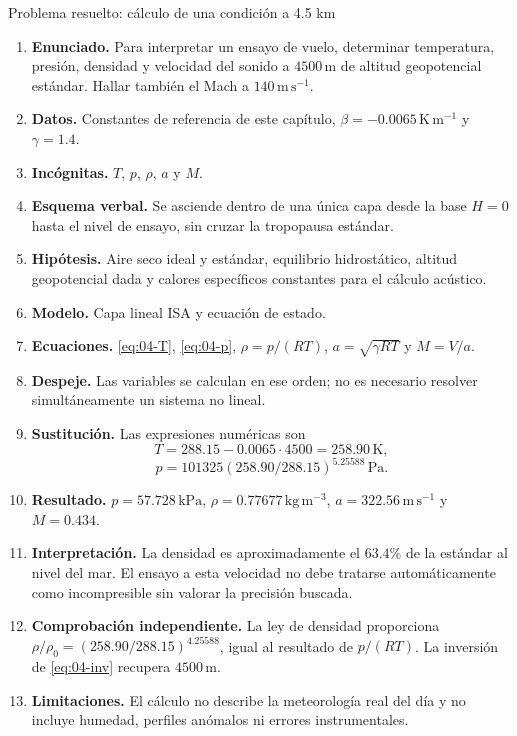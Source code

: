 \begin{studiumworked}{Problema resuelto: cálculo de una condición a 4.5 km}

\begin{enumerate}
\item \textbf{Enunciado.} Para interpretar un ensayo de vuelo, determinar temperatura, presión, densidad y velocidad del sonido a $4500\,\mathrm{m}$ de altitud geopotencial estándar. Hallar también el Mach a $140\,\mathrm{m\,s^{-1}}$.
\item \textbf{Datos.} Constantes de referencia de este capítulo, $\beta=-0.0065\,\mathrm{K\,m^{-1}}$ y $\gamma=1.4$.
\item \textbf{Incógnitas.} $T$, $p$, $\rho$, $a$ y $M$.
\item \textbf{Esquema verbal.} Se asciende dentro de una única capa desde la base $H=0$ hasta el nivel de ensayo, sin cruzar la tropopausa estándar.
\item \textbf{Hipótesis.} Aire seco ideal y estándar, equilibrio hidrostático, altitud geopotencial dada y calores específicos constantes para el cálculo acústico.
\item \textbf{Modelo.} Capa lineal ISA y ecuación de estado.
\item \textbf{Ecuaciones.} \eqref{eq:04-T}, \eqref{eq:04-p}, $\rho=p/(RT)$, $a=\sqrt{\gamma RT}$ y $M=V/a$.
\item \textbf{Despeje.} Las variables se calculan en ese orden; no es necesario resolver simultáneamente un sistema no lineal.
\item \textbf{Sustitución.} Las expresiones numéricas son
\[
 T=288.15-0.0065\cdot4500=258.90\,\mathrm{K},
\]
\[
 p=101325(258.90/288.15)^{5.25588}\,\mathrm{Pa}.
\]
\item \textbf{Resultado.} $p=57.728\,\mathrm{kPa}$, $\rho=0.77677\,\mathrm{kg\,m^{-3}}$, $a=322.56\,\mathrm{m\,s^{-1}}$ y $M=0.434$.
\item \textbf{Interpretación.} La densidad es aproximadamente el $63.4\%$ de la estándar al nivel del mar. El ensayo a esta velocidad no debe tratarse automáticamente como incompresible sin valorar la precisión buscada.
\item \textbf{Comprobación independiente.} La ley de densidad proporciona $\rho/\rho_0=(258.90/288.15)^{4.25588}$, igual al resultado de $p/(RT)$. La inversión de \eqref{eq:04-inv} recupera $4500\,\mathrm{m}$.
\item \textbf{Limitaciones.} El cálculo no describe la meteorología real del día y no incluye humedad, perfiles anómalos ni errores instrumentales.
\end{enumerate}


\end{studiumworked}
